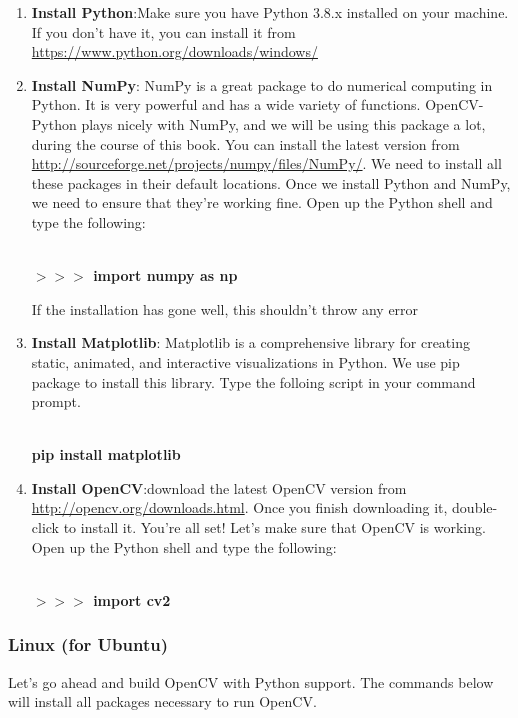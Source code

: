 \begin{enumerate}
	\item \textbf{Install Python}:Make sure you have Python 3.8.x installed on your machine. If you don't have it, you can install it from \url{https://www.python.org/downloads/windows/}
	
	\item \textbf{Install NumPy}: NumPy is a great package to do numerical computing in Python. It is very powerful and has a wide variety of functions. OpenCV-Python plays nicely with NumPy, and we will be using this package a lot, during the course of this book. You can install the latest version from \url{http://sourceforge.net/projects/numpy/files/NumPy/}. We need to install all these packages in their default locations. Once we install Python and NumPy, we need to ensure that they're working fine. Open up the Python shell and type the following:
	
	\vspace{0.5cm}
	\colorbox{lgray}{\\\textbf{$>>>$ import numpy as np}}
	\vspace{0.5cm}
	
	If the installation has gone well, this shouldn't throw any error
	
	\item \textbf{Install Matplotlib}: Matplotlib is a comprehensive library for creating static, animated, and interactive visualizations in Python. We use pip package to install this library. Type the folloing script in your command prompt. 
	
	\vspace{0.5cm}
	\colorbox{lgray}{\\\textbf{pip install matplotlib}}
	\vspace{0.5cm}
	
	\item \textbf{Install OpenCV}:download the latest OpenCV version from \url{http://opencv.org/downloads.html}. Once you finish downloading it, double-click to install it. You're all set! Let's make sure that OpenCV is working. Open up the Python shell and type the following:
	
	\vspace{0.5cm}
	\colorbox{lgray}{\\\textbf{$>>>$ import cv2}}
	\vspace{0.5cm}
\end{enumerate}

\subsubsection{Linux (for Ubuntu)}
Let’s go ahead and build OpenCV with Python support. The commands below will install all packages necessary to run OpenCV.

